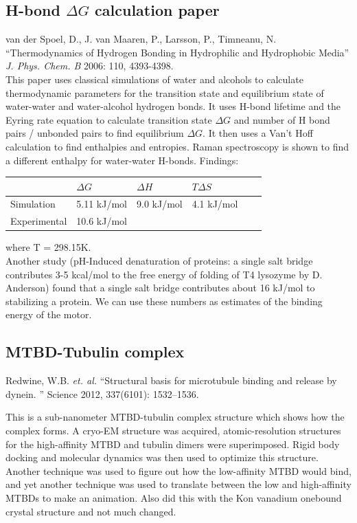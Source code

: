 \documentclass[10pt]{article} %
\begin{document}
\subsection{H-bond $\Delta G$ calculation paper}
van der Spoel, D., J. van Maaren, P., Larsson, P., Timneanu, N. ``Thermodynamics of Hydrogen Bonding in Hydrophilic and Hydrophobic Media'' \textit{J. Phys. Chem. B} 2006: 110, 4393-4398.\\

This paper uses classical simulations of water and alcohols to calculate thermodynamic parameters for the transition state and equilibrium state of water-water and water-alcohol
hydrogen bonds. It uses H-bond lifetime and the Eyring rate equation to calculate transition state $\Delta G$ and number of H bond pairs / unbonded pairs to find equilibrium
$\Delta G$. It then uses a Van't Hoff calculation to find enthalpies and entropies. Raman spectroscopy is shown to find a different enthalpy for water-water H-bonds. Findings:

\begin{center}
  \begin{tabular}{| l | l | l | l | l | l |}
    \hline
    & $\Delta G$ & $\Delta H$ & $T\Delta S$ \\\hline
    Simulation & 5.11 kJ/mol & 9.0 kJ/mol & 4.1 kJ/mol\\ \hline
    Experimental & 10.6 kJ/mol & & \\ \hline
  \end{tabular}
\end{center}

where T = 298.15K.\\

Another study (pH-Induced denaturation of proteins: a single salt bridge contributes 3-5 kcal/mol to the free energy of folding of T4 lysozyme by D. Anderson) found that
a single salt bridge contributes about 16 kJ/mol to stabilizing a protein. We can use these numbers as estimates of the binding energy of the motor.\\

\subsection{MTBD-Tubulin complex}
Redwine, W.B. \textit{et. al.} ``Structural basis for microtubule binding and release by dynein. '' Science 2012, 337(6101): 1532–1536.

This is a sub-nanometer MTBD-tubulin complex structure which shows how the complex forms. A cryo-EM structure was acquired, atomic-resolution structures for the high-affinity
MTBD and tubulin dimers were superimposed.  Rigid body docking and molecular dynamics was then used to optimize this structure. Another technique was used to figure out how
the low-affinity MTBD would bind, and yet another technique was used to translate between the low and high-affinity MTBDs to make an animation. Also did this with the Kon
vanadium onebound crystal structure and not much changed.\\
\end{document}
